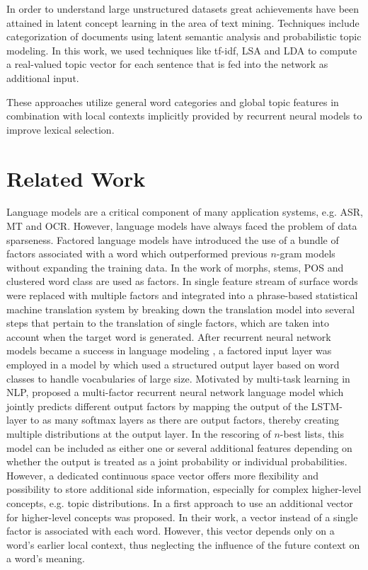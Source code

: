 \documentclass[a4paper]{article}
\begin{document}
In order to understand large unstructured datasets great achievements have been attained in latent concept learning in the area of text mining. Techniques include categorization of documents using latent semantic analysis and probabilistic topic modeling. In this work, we used techniques like tf-idf, LSA and LDA to compute a real-valued topic vector for each sentence that is fed into the network as additional input. 

These approaches utilize general word categories and global topic features in combination with local contexts implicitly provided by recurrent neural models to improve lexical selection. 


\section{Related Work}
Language models are a critical component of many application systems, e.g. ASR, MT and OCR. However, language models have always faced the problem of data sparseness. Factored language models \cite{bilmes2003factored} have introduced the use of a bundle of factors associated with a word which outperformed previous $n$-gram models without expanding the training data. In the work of \cite{bilmes2003factored} morphs, stems, POS and clustered word class are used as factors. In \cite{koehn2007factored} single feature stream of surface words were replaced with multiple factors and integrated into a phrase-based statistical machine translation system by breaking down the translation model into several steps that pertain to the translation of single factors, which are taken into account when the target word is generated.
After recurrent neural network models became a success in language modeling \cite{mikolov2010recurrent}, a factored input layer was employed in a model by \cite{wu2012factored} which used a structured output layer based on word classes to handle vocabularies of large size.
Motivated by multi-task learning in NLP, \cite{niehuesusing} proposed a multi-factor recurrent neural network language model which jointly predicts different output factors by mapping the output of the LSTM-layer to as many softmax layers as there are output factors, thereby creating multiple distributions at the output layer. In the rescoring of $n$-best lists, this model can be included as either one or several additional features depending on whether the output is treated as a joint probability or individual probabilities.
However, a dedicated continuous space vector offers more flexibility and possibility to store additional side information, especially for complex higher-level concepts, e.g. topic distributions. In \cite{mikolov2012context} a first approach to use an additional vector for higher-level concepts was proposed. In their work, a vector instead of a single factor is associated with each word. However, this vector depends only on a word's earlier local context, thus neglecting the influence of the future context on a word's meaning. 
\end{document}
